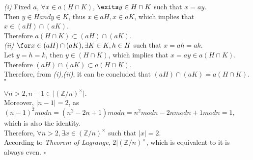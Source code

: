 \documentclass[11pt]{article}
\newcommand{\abs}[1]{\lvert #1 \rvert}
\newenvironment{problem}[2][Problem]{\begin{trivlist}
\item[\hskip \labelsep {\bfseries #1}\hskip \labelsep {\bfseries #2.}]}{\end{trivlist}}
\begin{document}
\begin{problem}{4}
\textit{(i)} Fixed $a$, $\forall x \in a(H\cap K)$, $\exits y \in H\cap K$ such that $x = ay$.\\
Then $y \in H and y\in K$, thus $x\in aH, x\in aK$, which implies that $x\in (aH)\cap (aK)$.\\
Therefore $a(H \cap K) \subset (aH)\cap(aK)$.\\
\textit{(ii)} $\for x \in (aH)\cap (aK), \exists K \in K, h \in H$ such that $x = ah = ak$.\\
Let $ y = h = k$, then $y \in (H\cap K)$, which implies that $x = ay \in a (H \cap K)$.\\
Therefore $ (aH)\cap(aK) \subset a(H \cap K)$.\\
Therefore, from \textit{(i),(ii)}, it can be concluded that $ (aH)\cap(aK) = a(H \cap K)$. $\square$\\
\end{problem}

\begin{problem}{5}
$\forall n > 2, n -1 \in \abs{ (\mathbb{Z} /n)^{\times} }$.\\
Moreover, $\abs{n-1} = 2$, as $(n-1)^2 mod n = (n^2 -2n +1) mod n = n^2 mod n - 2n mod n +1 mod n =1$, which is also the identity.\\
Therefore, $\forall n > 2, \exists x \in (\mathbb{Z} /n)^{\times}$ such that $\abs{x} = 2$.\\
According to \textit{Theorem of Lagrange}, $2 | (\mathbb{Z} /n)^{\times}$, which is equivalent to it is always even. $\square$\\
\end{problem}
\end{document}
